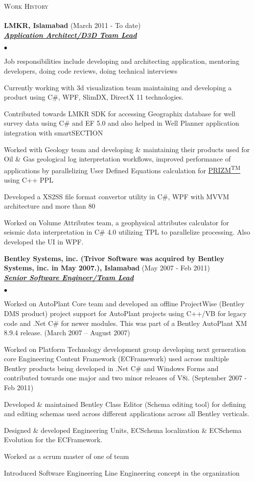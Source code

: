 \documentclass{article}
\newcommand{\lineunder}{\vspace*{-8pt} \\ \hspace*{-18pt} \hrulefill \\}
\newcommand{\header}[1]{{\hspace*{-15pt}\vspace*{6pt} \textsc{#1}} \vspace*{-6pt} \lineunder}
\newcommand{\employer}[3]{{ \textbf{#1} (#2)\\ \underline{\textbf{\emph{#3}}}\\  }}
\newenvironment{achievements}{\begin{list}{$\bullet$}{\topsep 0pt \itemsep -2pt}}{\vspace*{4pt}\end{list}}
\begin{document}
\header{Work History}
\employer{LMKR, Islamabad}{March 2011 - To date}{Application Architect/D3D Team Lead}
	\begin{achievements}
	\item Job responsibilities include developing and architecting application, mentoring developers, doing code reviews, doing technical interviews
	\item Currently working with 3d visualization team maintaining and developing a product using C\#, WPF, SlimDX, DirectX 11 technologies.
	\item Contributed towards LMKR SDK for accessing Geographix database for well survey data using C\# and EF 5.0 and also helped in Well Planner application integration with smartSECTION
	\item Worked with Geology team and developing \& maintaining their products used for Oil \& Gas geological log interpretation workflows, improved performance of applications by parallelizing User Defined Equations calculation for \href{http://www.lmkr.com/geographix/by-solution/lmkr-geographix/prizm%E2%84%A2/}{PRIZM\textsuperscript{TM}} using C++ PPL 
	\item Developed a XS2SS file format convertor utility in C\#, WPF with MVVM architecture and more than 80%
	\item Worked on Volume Attributes team, a geophysical attributes calculator for seismic data interpretation in C\# 4.0 utilizing TPL to parallelize processing. Also developed the UI in WPF.  
	\end{achievements}

\employer{Bentley Systems, inc. (Trivor Software was acquired by Bentley Systems, inc. in May 2007.), Islamabad}{May 2007 - Feb 2011}{Senior Software Engineer/Team Lead}
	\begin{achievements}
	\item Worked on AutoPlant Core team and developed an offline ProjectWise (Bentley DMS product) project support for AutoPlant projects using C++/VB for legacy code and .Net C\# for newer modules. This was part of a Bentley AutoPlant XM 8.9.4 release. (March 2007 – August 2007)
	\item Worked on Platform Technology development group developing next gerneration core Engineering Content Framework (ECFramework) used across multiple Bentley products being developed in .Net C\# and Windows Forms and contributed towards one major and two minor releases of V8i. (September 2007 - Feb 2011)
	\item Developed \& maintained Bentley Class Editor (Schema editing tool) for defining and editing schemas used across different applications across all Bentley verticals.
	\item Designed \& developed Engineering Units, ECSchema localization \& ECSchema Evolution for the ECFramework.
	\item Worked as a scrum master of one of team
	\item Introduced Software Engineering Line Engineering concept in the organization
	\end{achievements}
\end{document}
